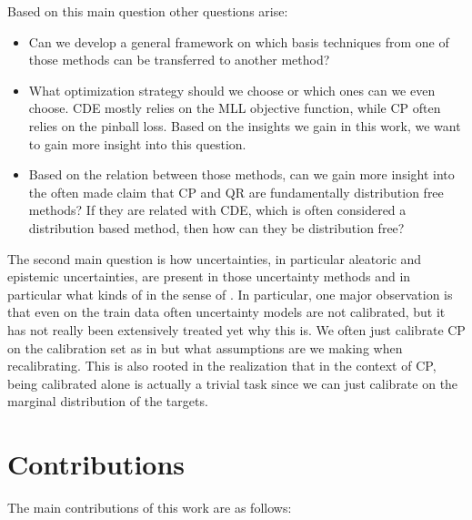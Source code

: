 Based on this main question other questions arise:

\begin{itemize}
    \item Can we develop a general framework on which basis techniques from one of those methods can be transferred to another method?
    \item What optimization strategy should we choose or which ones can we even choose. CDE mostly relies on the MLL objective function, while CP often relies on the pinball loss. Based on the insights we gain in this work, we want to gain more insight into this question.
    \item Based on the relation between those methods, can we gain more insight into the often made claim that CP and QR are fundamentally distribution free methods? If they are related with CDE, which is often considered a distribution based method, then how can they be distribution free?
\end{itemize}

The second main question is how uncertainties, in particular aleatoric and epistemic uncertainties, are present in those uncertainty methods and in particular what kinds of in the sense of \cite{hullermeier_aleatoric_2021}. In particular, one major observation is that even on the train data often uncertainty models are not calibrated, but it has not really been extensively treated yet why this is. We often just calibrate CP on the calibration set as in \cite{sesia2021conformal} but what assumptions are we making when recalibrating. This is also rooted in the realization that in the context of CP, being calibrated alone is actually a trivial task since we can just calibrate on the marginal distribution of the targets.

\section{Contributions}\label{sec:contributions}

The main contributions of this work are as follows:


